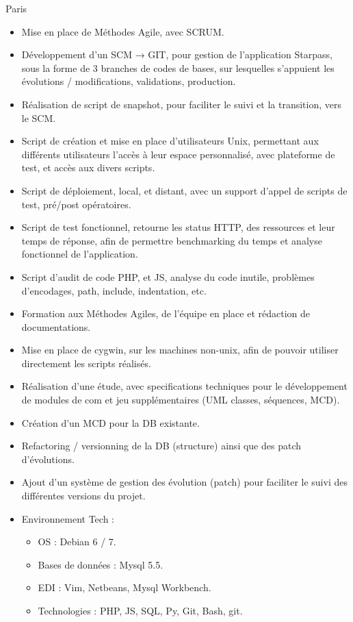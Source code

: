 \documentclass[10pt,a4paper,sans]{moderncv}
\begin{document}
{Paris}{
    \begin{itemize}%
        \item Mise en place de Méthodes Agile, avec SCRUM.
        \item Développement d'un SCM → GIT, pour gestion de l'application Starpass, sous la forme de 3 branches de codes de bases, sur lesquelles s'appuient les évolutions / modifications, validations, production.
        \item Réalisation de script de snapshot, pour faciliter le suivi et la transition, vers le SCM.
        \item Script de création et mise en place d'utilisateurs Unix, permettant aux différents utilisateurs l'accès à leur espace personnalisé, avec plateforme de test, et accès aux divers scripts.
        \item Script de déploiement, local, et distant, avec un support d'appel de scripts de test, pré/post opératoires.
        \item Script de test fonctionnel, retourne les status HTTP, des ressources et leur temps de réponse, afin de permettre benchmarking du temps et analyse fonctionnel de l'application.
        \item Script d'audit de code PHP, et JS, analyse du code inutile, problèmes d'encodages, path, include, indentation, etc.
        \item Formation aux Méthodes Agiles, de l'équipe en place et rédaction de documentations.
        \item Mise en place de cygwin, sur les machines non-unix, afin de pouvoir utiliser directement les scripts réalisés.
        \item Réalisation d'une étude, avec specifications techniques pour le développement de modules de com et jeu supplémentaires (UML classes, séquences, MCD).
        \item Création d'un MCD pour la DB existante.
        \item Refactoring / versionning de la DB (structure) ainsi que des patch d'évolutions.
        \item Ajout d'un système de gestion des évolution (patch) pour faciliter le suivi des différentes versions du projet.
        \item Environnement Tech :
            \begin{itemize}%
                \item OS : Debian 6 / 7.
                \item Bases de données : Mysql 5.5.
                \item EDI : Vim, Netbeans, Mysql Workbench.
                \item Technologies : PHP, JS, SQL, Py, Git, Bash, git.
            \end{itemize}
\end{itemize}}
\end{document}
